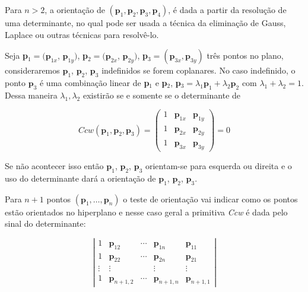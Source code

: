 \documentclass[12pt,a4paper]{book}
\begin{document}
Para $n>2$, a orienta\c{c}\~{a}o de $(\mathbf{p}_{1},\mathbf{p}_{2},\mathbf{p%
}_{3},\mathbf{p}_{4})$, \'{e} dada a partir da resolu\c{c}\~{a}o de uma
determinante, no qual pode ser usada a t\'{e}cnica da elimina\c{c}\~{a}o de
Gauss, Laplace ou outras t\'{e}cnicas para resolv\^{e}-lo.

Seja \textbf{p}$_{1}=(\mathbf{p}_{1x}$, $\mathbf{p}_{1y})$, \textbf{p}$_{2}=(%
\mathbf{p}_{2x}$, $\mathbf{p}_{2y})$, \textbf{p}$_{3}=(\mathbf{p}_{3x},\mathbf{p%
}_{3y})$ tr\^{e}s pontos no plano, consideraremos $\mathbf{p}_{1}$, $\mathbf{p}%
_{2}$, $\mathbf{p}_{3}$ indefinidos se forem coplanares. No caso indefinido, o
ponto $\mathbf{p}_{3}$ \'{e} uma combina\c{c}\~{a}o linear de \textbf{p}$_{1}$ e 
\textbf{p}$_{2}$, \textbf{p}$_{3}=\lambda _{1}\mathbf{p}_{1}+\lambda _{2}%
\mathbf{p}_{2}$ com $\lambda _{1}+\lambda _{2}=1$. Dessa maneira $\lambda
_{1},\lambda _{2}$ existir\~{a}o se e somente se o determinante de

\begin{equation}
Ccw(\mathbf{p}_{1}, \mathbf{p}_{2}, \mathbf{p}_{3})=%
\left( \begin{array}{ccc}
1 & \mathbf{p}_{1x} & \mathbf{p}_{1y} \\ 
1 & \mathbf{p}_{2x} & \mathbf{p}_{2y} \\ 
1 & \mathbf{p}_{3x} & \mathbf{p}_{3y}%
\end{array} \right)%
=0
\end{equation}

Se n\~{a}o acontecer isso ent\~{a}o $\mathbf{p}_{1}$, $\mathbf{p}_{2}$, $\mathbf{p}%
_{3}$ orientam-se para esquerda ou direita e o uso do determinante dar\'{a}
a orienta\c{c}\~{a}o de $\mathbf{p}_{1}$, $\mathbf{p}_{2}$, $\mathbf{p}_{3}$.

Para $n+1$ pontos $(\mathbf{p}_{1},\ldots ,\mathbf{p}_{n})$ o teste de
orienta\c{c}\~{a}o vai indicar como os pontos est\~{a}o orientados no
hiperplano e nesse caso geral a primitiva \textit{Ccw} \'{e} dada pelo sinal
do determinante:

\begin{equation}
\left\vert 
\begin{array}{ccccc}
1 & \mathbf{p}_{12} & \cdots & \mathbf{p}_{1n} & \mathbf{p}_{11} \\ 
1 & \mathbf{p}_{22} & \cdots & \mathbf{p}_{2n} & \mathbf{p}_{21} \\ 
\vdots & \vdots &  & \vdots & \vdots \\ 
1 & \mathbf{p}_{n+1,2} & \cdots & \mathbf{p}_{n+1,n} & \mathbf{p}_{n+1,1}%
\end{array}%
\right\vert
\end{equation}
\end{document}
